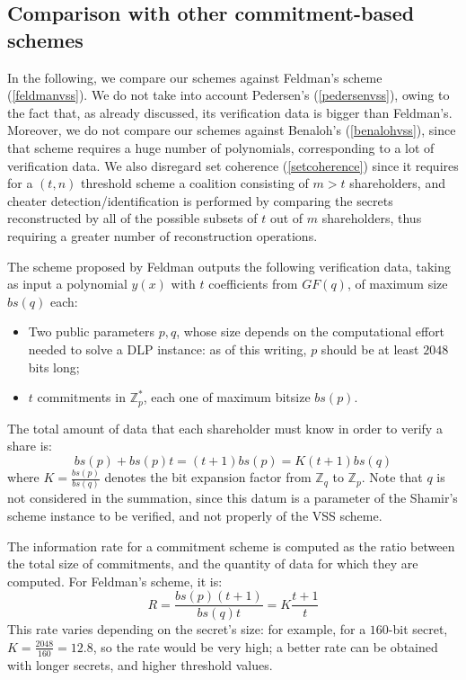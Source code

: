 \documentclass[10pt,journal,cspaper,compsoc]{IEEEtran}
\begin{document}
\subsection{Comparison with other commitment-based schemes}
In the following, we compare our schemes against Feldman's scheme  (\ref{feldmanvss}). We do not take into account Pedersen's (\ref{pedersenvss}), owing to the fact that, as already discussed, its verification data is bigger than Feldman's. Moreover, we do not compare our schemes against Benaloh's (\ref{benalohvss}), since that scheme requires a huge number of polynomials, corresponding to a lot of verification data. We also disregard set coherence (\ref{setcoherence}) since it requires for a $(t, n)$ threshold scheme a coalition consisting of $m > t$ shareholders, and cheater detection/identification is performed by comparing the secrets reconstructed by all of the possible subsets of $t$ out of $m$ shareholders, thus requiring a greater number of reconstruction operations.  

The scheme proposed by Feldman outputs the following verification data, taking as input a polynomial $y(x)$ with $t$ coefficients from $GF(q)$, of maximum size $bs(q)$ each:

\begin{itemize}
\item Two public parameters $p,q$, whose size depends on the computational effort needed to solve a DLP instance: as of this writing, $p$ should be at least $2048$ bits long;
\item $t$ commitments in $\mathbb{Z}_p^*$, each one of maximum bitsize $bs(p)$.
\end{itemize}

The total amount of data that each shareholder must know in order to verify a share is:
\begin{equation}
bs(p) + bs(p) t  = (t+1)bs(p) = K(t+1)bs(q)
\end{equation}
where $K=\frac{bs(p)}{bs(q)}$ denotes the bit expansion factor from $\mathbb{Z}_q$ to $\mathbb{Z}_p$.
Note that $q$ is not considered in the summation, since this datum is a parameter of the Shamir's scheme instance to be verified, and not properly of the VSS scheme. 

The information rate for a commitment scheme is computed as the ratio between the total size of commitments, and the quantity of data for which they are computed. For Feldman's scheme, it is:
\begin{equation}
R = \frac{bs(p)(t+1)}{{bs(q)}t} = K \frac{t+1}{t}
\end{equation}
This rate varies depending on the secret's size: for example, for a $160$-bit secret, $K = \frac{2048}{160} = 12.8 $, so the rate would be very high; a better rate can be obtained with longer secrets, and higher threshold values.
\end{document}
